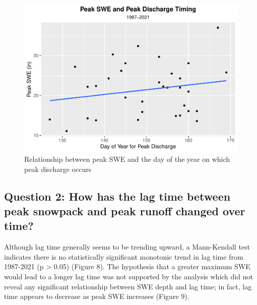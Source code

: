 \documentclass[
  12pt,
]{article}
\begin{document}
\begin{figure}
\centering
\includegraphics{Final_Report_files/figure-latex/unnamed-chunk-5-1.pdf}
\caption{Relationship between peak SWE and the day of the year on which
peak discharge occurs}
\end{figure}

\newpage

\hypertarget{question-2-how-has-the-lag-time-between-peak-snowpack-and-peak-runoff-changed-over-time}{%
\subsection{Question 2: How has the lag time between peak snowpack and
peak runoff changed over
time?}\label{question-2-how-has-the-lag-time-between-peak-snowpack-and-peak-runoff-changed-over-time}}

Although lag time generally seems to be trending upward, a Mann-Kendall
test indicates there is no statistically significant monotonic trend in
lag time from 1987-2021 (p \textgreater{} 0.05) (Figure 8). The
hypothesis that a greater maximum SWE would lead to a longer lag time
was not supported by the analysis which did not reveal any significant
relationship between SWE depth and lag time; in fact, lag time appears
to decrease as peak SWE increases (Figure 9).
\end{document}
